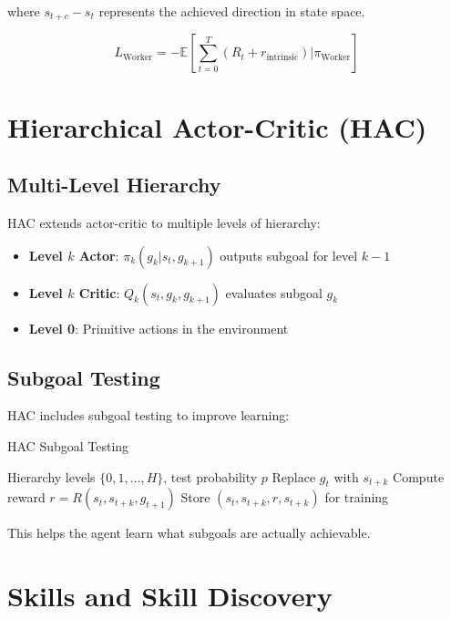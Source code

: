 where $s_{t+c} - s_t$ represents the achieved direction in state space.

\begin{equation}
L_{\text{Worker}} = -\mathbb{E} \left[ \sum_{t=0}^T (R_t + r_{\text{intrinsic}}) \bigg| \pi_{\text{Worker}} \right]
\end{equation}

\section{Hierarchical Actor-Critic (HAC)}

\subsection{Multi-Level Hierarchy}

HAC extends actor-critic to multiple levels of hierarchy:

\begin{itemize}
    \item \textbf{Level $k$ Actor}: $\pi_k(g_k|s_t, g_{k+1})$ outputs subgoal for level $k-1$
    \item \textbf{Level $k$ Critic}: $Q_k(s_t, g_k, g_{k+1})$ evaluates subgoal $g_k$
    \item \textbf{Level 0}: Primitive actions in the environment
\end{itemize}

\subsection{Subgoal Testing}

HAC includes subgoal testing to improve learning:

\begin{algorithm}
\caption{HAC Subgoal Testing}
\begin{algorithmic}
\REQUIRE Hierarchy levels $\{0, 1, \ldots, H\}$, test probability $p$
        \STATE Replace $g_t$ with $s_{t+k}$ 
        \STATE Compute reward $r = R(s_t, s_{t+k}, g_{t+1})$
        \STATE Store $(s_t, s_{t+k}, r, s_{t+k})$ for training
    \ENDIF
\ENDFOR
\end{algorithmic}
\end{algorithm}

This helps the agent learn what subgoals are actually achievable.

\section{Skills and Skill Discovery}

